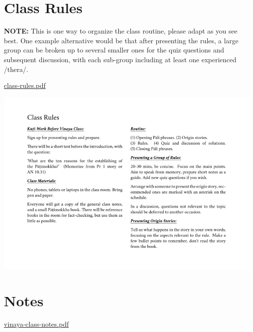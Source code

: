 \section{Class Rules}

\textbf{NOTE:} This is one way to organize the class routine, please
adapt as you see best. One example alternative would be that after
presenting the rules, a large group can be broken up to several smaller
ones for the quiz questions and subsequent discussion, with each
sub-group including at least one experienced /thera/.

\href{./includes/docs/class-rules.pdf}{class-rules.pdf}

\href{./includes/docs/class-rules.pdf}{\includegraphics{./includes/docs/class-rules-thumb.png}}

\section{Notes}

\href{./includes/docs/vinaya-class-notes.pdf}{vinaya-class-notes.pdf}

